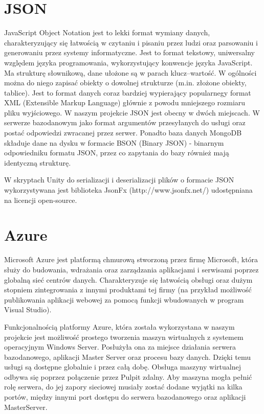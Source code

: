 \section{JSON}
JavaScript Object Notation jest to lekki format wymiany danych, charakteryzujący się łatwością w czytaniu i pisaniu przez ludzi oraz parsowaniu i generowaniu przez systemy informatyczne. Jest to format tekstowy, uniwersalny względem języka programowania, wykorzystujący konwencje języka JavaScript. Ma strukturę słownikową, dane ułożone są w parach klucz–wartość. W ogólności można do niego zapisać obiekty o dowolnej strukturze (m.in. złożone obiekty, tablice). Jest to format danych coraz bardziej wypierający popularnegy format XML (Extensible Markup Language) głównie z powodu mniejszego rozmiaru pliku wyjściowego. W naszym projekcie JSON jest obecny w dwóch miejscach. W serwerze bazodanowym jako format argumentów przesyłanych do usługi oraz postać odpowiedzi zwracanej przez serwer. Ponadto baza danych MongoDB składuje dane na dysku w formacie BSON (Binary JSON) - binarnym odpowiedniku formatu JSON, przez co zapytania do bazy również mają identyczną strukturę.

W skryptach Unity do serializacji i deserializacji plików o formacie JSON wykorzystywana jest biblioteka JsonFx (http://www.jsonfx.net/) udostępniana na licencji open-source.

\section{Azure}
Microsoft Azure jest platformą chmurową stworzoną przez firmę Microsoft, która służy do budowania, wdrażania oraz zarządzania aplikacjami i serwisami poprzez globalną sieć centrów danych. Charakteryzuje się łatwością obsługi oraz dużym stopniem zintegrowania z innymi produktami tej firmy (na przykład możliwość publikowania aplikacji webowej za pomocą funkcji wbudowanych w program Visual Studio). 

Funkcjonalnością platformy Azure, która została wykorzystana w naszym projekcie jest możliwość prostego tworzenia maszyn wirtualnych z systemem operacyjnym Windows Server. Posłużyła ona za miejsce działania serwera bazodanowego, aplikacji Master Server oraz procesu bazy danych. Dzięki temu usługi są dostępne globalnie i przez całą dobę. Obsługa maszyny wirtualnej odbywa się poprzez połączenie przez Pulpit zdalny. Aby maszyna mogła pełnić rolę serwera, do jej zapory sieciowej musiały zostać dodane wyjątki na kilka portów, między innymi port dostępu do serwera bazodanowego oraz aplikacji MasterServer.

